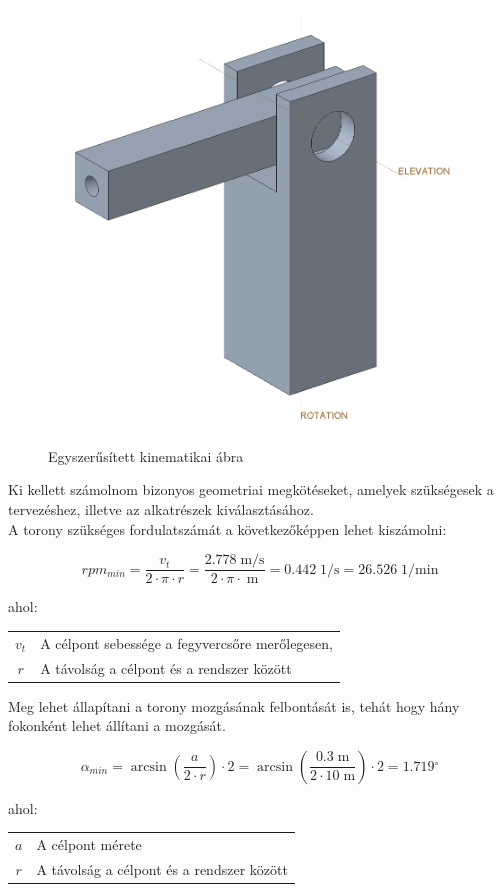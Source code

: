 \documentclass[12pt,a4paper]{article}
\newcommand{\w}[1]{\; \mathrm{#1}}
\begin{document}
\begin{figure}[h!]
	\centering
	\includegraphics[width=0.6\linewidth]{mockup}
	\caption{Egyszerűsített kinematikai ábra}
	\label{fig:megval_mockup}
\end{figure}

Ki kellett számolnom bizonyos geometriai megkötéseket, amelyek szükségesek a tervezéshez, illetve az alkatrészek kiválasztásához. \\

A torony szükséges fordulatszámát a következőképpen lehet kiszámolni:


\begin{equation}
	rpm_{min} = \frac{v_t}{2 \cdot \pi \cdot r} = \frac{2.778 \w{m/s}}{2 \cdot \pi \cdot \w{m}} = 0.442 \w{1/s} = 26.526 \w{1/min}
\end{equation}

ahol:

\begin{tabular}{cl}
	$v_t$ & A célpont sebessége a fegyvercsőre merőlegesen, \\
	$r$ & A távolság a célpont és a rendszer között\\
\end{tabular}

Meg lehet állapítani a torony mozgásának felbontását is, tehát hogy hány fokonként lehet állítani a mozgását.

\begin{equation}
	\alpha_{min} = \arcsin\left(\frac{a}{2 \cdot r}\right) \cdot 2 = \arcsin\left(\frac{0.3 \w{m}}{2 \cdot 10 \w{m}}\right) \cdot 2 = 1.719 {^\circ}
\end{equation}

ahol:

\begin{tabular}{cl}
	$a$ & A célpont mérete  \\
	$r$ & A távolság a célpont és a rendszer között\\
\end{tabular}
\pagebreak
\end{document}
